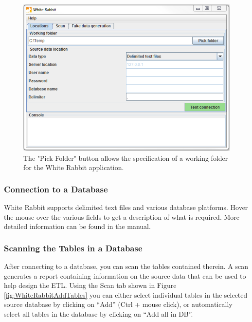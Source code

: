 \documentclass[11pt]{book}
\theoremstyle{definition}
\theoremstyle{definition}
\theoremstyle{definition}
\theoremstyle{remark}
\begin{document}
\begin{figure}
\includegraphics[width=1\linewidth]{images/ExtractTransformLoad/WhiteRabbitLocation} \caption{The "Pick Folder" button allows the specification of a working folder for the White Rabbit application.}\label{fig:WhiteRabbitLocation}
\end{figure}

\hypertarget{connection-to-a-database}{%
\subsubsection*{Connection to a Database}\label{connection-to-a-database}}

White Rabbit supports delimited text files and various database platforms. Hover the mouse over the various fields to get a description of what is required. More detailed information can be found in the manual.

\hypertarget{scanning-the-tables-in-a-database}{%
\subsubsection*{Scanning the Tables in a Database}\label{scanning-the-tables-in-a-database}}

After connecting to a database, you can scan the tables contained therein. A scan generates a report containing information on the source data that can be used to help design the ETL. Using the Scan tab shown in Figure \ref{fig:WhiteRabbitAddTables} you can either select individual tables in the selected source database by clicking on ``Add'' (Ctrl + mouse click), or automatically select all tables in the database by clicking on ``Add all in DB''.
\end{document}
